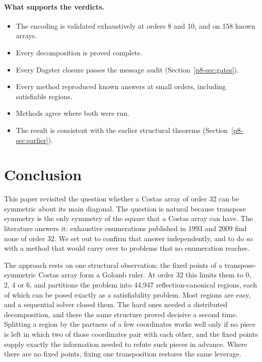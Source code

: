 \documentclass[11pt,a4paper,oneside]{report}
\theoremstyle{definition}
\begin{document}
\paragraph{What supports the verdicts.}
\begin{itemize}
\item The encoding is validated exhaustively at orders 8 and 10, and on 158 known arrays.
\item Every decomposition is proved complete.
\item Every Dagster closure passes the message audit (Section~\ref{p8-sec:gates}).
\item Every method reproduced known answers at small orders, including satisfiable regions.
\item Methods agree where both were run.
\item The result is consistent with the earlier structural theorems (Section~\ref{p8-sec:earlier}).
\end{itemize}

\section{Conclusion}

This paper revisited the question whether a Costas array of order 32 can be symmetric about its
main diagonal. The question is natural because transpose symmetry is the only symmetry of the
square that a Costas array can have. The literature answers it: exhaustive enumerations published
in 1993 and 2009 find none of order 32. We set out to confirm that answer independently, and to do so with
a method that would carry over to problems that no enumeration reaches.

The approach rests on one structural observation: the fixed points of a transpose-symmetric
Costas array form a Golomb ruler. At order 32 this limits them to 0, 2, 4 or 6, and partitions the
problem into 44{,}947 reflection-canonical regions, each of which can be posed exactly as a
satisfiability problem. Most regions are easy, and a sequential solver closed them. The hard ones
needed a distributed decomposition, and there the same structure proved decisive a second time.
Splitting a region by the partners of a few coordinates works well only if no piece is left in
which two of those coordinates pair with each other, and the fixed points supply exactly the
information needed to refute such pieces in advance. Where there are no fixed points, fixing one
transposition restores the same leverage.
\end{document}
